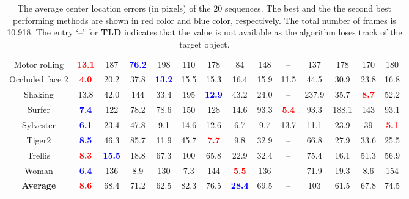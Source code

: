 \documentclass[10pt,twocolumn,letterpaper]{article}
\begin{document}
\begin{table*}
\begin{center}
\begin{tabular}{|c||c|c|c|c|c|c|c|c|c|c|c|c|c|}
  Motor rolling & \textcolor{red}{\bf 13.1} & 187 & \textcolor{blue}{\bf 76.2} & 198 & 110 & 178 & 84 & 148 & -- & 137 & 178 & 170 & 180 \\
  Occluded face 2 & \textcolor{red}{\bf 4.0} & 20.2 & 37.8 & \textcolor{blue}{\bf 13.2} & 15.5 & 15.3 & 16.4 & 15.9 & 11.5 & 44.5 & 30.9 & 23.8 & 16.8 \\
  Shaking & 13.8 & 42.0 & 144 & 33.4 & 195 & \textcolor{blue}{\bf 12.9} & 43.2 & 24.0 & -- & 237.9 & 35.7 & \textcolor{red}{\bf 8.7} & 52.2 \\
  Surfer & \textcolor{blue}{\bf 7.4} & 122 & 78.2 & 78.6 & 150 & 128 & 14.6 & 93.3 & \textcolor{red}{\bf 5.4} & 93.3 & 188.1 & 143 & 93.1 \\
  Sylvester & \textcolor{blue}{\bf 6.1} & 23.4 & 47.8 & 9.1 & 14.6 & 12.6 & 6.7 & 9.7 & 13.7 & 11.1 & 23.9 & 39 & \textcolor{red}{\bf 5.1} \\
  Tiger2 & \textcolor{blue}{\bf 8.5} & 46.3 & 85.7 & 11.9 & 45.7 & \textcolor{red}{\bf 7.7} & 9.8 & 32.9 & -- & 66.8 & 27.9 & 33.6 & 25.5 \\
  Trellis & \textcolor{red}{\bf 8.3} & \textcolor{blue}{\bf 15.5} & 18.8 & 67.3 & 100 & 65.8 & 22.9 & 32.4 & -- & 75.4 & 16.1 & 51.3 & 56.9 \\
  Woman & \textcolor{blue}{\bf 6.4} & 136 & 8.9 & 130 & 7.3 & 144 & \textcolor{red}{\bf 5.5} & 136 & -- & 71.9 & 19.3 & 8.6 & 154 \\
  \hline
  {\bf Average} & \textcolor{red}{\bf 8.6} & 68.4 & 71.2 & 62.5 & 82.3 & 76.5 & \textcolor{blue}{\bf 28.4} & 69.5 & -- & 103 & 61.5 & 67.8 & 74.5 \\
  \hline
\end{tabular}
\end{center}
\caption{The average center location errors (in pixels) of the 20 sequences. The best and the the second best performing methods are shown in red color and blue color, respectively. The total number of frames is 10,918. The entry `--' for {\bf TLD} indicates that the value is not available as the algorithm loses track of the target object.}
\label{tab}
\end{table*}
\end{document}
